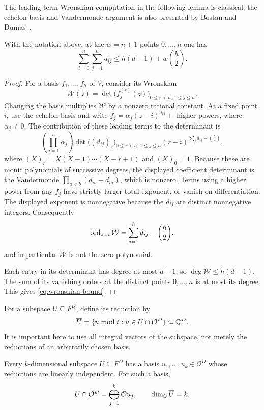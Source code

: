 The leading-term Wronskian computation in the following lemma is
classical; the echelon-basis and Vandermonde argument is also presented
by Bostan and Dumas~\citep[Lemmas~1--3]{BD10}.

\begin{lemma}
\label{lem:wronskian-orders}
With the notation above, at the $w=n+1$ points $0,\ldots,n$ one has
\begin{equation}
  \sum_{i=0}^n\sum_{j=1}^h d_{ij}
  \leq h(d-1)+w\binom{h}{2}.
  \label{eq:wronskian-bound}
\end{equation}
\end{lemma}

\begin{proof}
For a basis $f_1,\ldots,f_h$ of $V$, consider its Wronskian
\[
  \mathcal W(z)=\det\bigl(f_j^{(r)}(z)\bigr)_{
       0\leq r<h,\,1\leq j\leq h}.
\]
Changing the basis multiplies $\mathcal W$ by a nonzero rational
constant.  At a fixed point $i$, use the echelon basis and write
$f_j=\alpha_j(z-i)^{d_{ij}}+$ higher powers, where $\alpha_j\neq0$.
The contribution of these leading terms to the determinant is
\[
  \left(\prod_{j=1}^h\alpha_j\right)
  \det\bigl((d_{ij})_r\bigr)_{
       0\leq r<h,\,1\leq j\leq h}
  (z-i)^{\sum_jd_{ij}-\binom h2},
\]
where $(X)_r=X(X-1)\cdots(X-r+1)$ and $(X)_0=1$.  Because these are
monic polynomials of successive degrees, the displayed coefficient
determinant is the Vandermonde
$\prod_{a<b}(d_{ib}-d_{ia})$, which is nonzero.  Terms using a higher
power from any $f_j$ have strictly larger total exponent, or vanish on
differentiation.  The displayed exponent is nonnegative because the
$d_{ij}$ are distinct nonnegative integers.  Consequently
\[
  \operatorname{ord}_{z=i}\mathcal W
  =\sum_{j=1}^h d_{ij}-\binom h2,
\]
and in particular $\mathcal W$ is not the zero polynomial.

Each entry in its determinant has degree at most $d-1$, so
$\deg\mathcal W\leq h(d-1)$.  The sum of its vanishing orders at the
distinct points $0,\ldots,n$ is at most its degree.  This gives
\eqref{eq:wronskian-bound}.
\end{proof}

For a subspace $U\subseteq F^D$, define its reduction by
\[
  \overline U
  =\{u\bmod t:u\in U\cap\mathcal O^D\}\subseteq\mathbb Q^D.
\]
It is important here to use all integral vectors of the subspace, not
merely the reductions of an arbitrarily chosen basis.

\begin{lemma}
\label{lem:integral-reduction}
Every $k$-dimensional subspace $U\subseteq F^D$ has a basis
$u_1,\ldots,u_k\in\mathcal O^D$ whose reductions are linearly independent.
For such a basis,
\begin{equation}
  U\cap\mathcal O^D=\bigoplus_{j=1}^k\mathcal O u_j,
  \qquad
  \dim_{\mathbb Q}\overline U=k.
  \label{eq:integral-lattice}
\end{equation}
\end{lemma}

